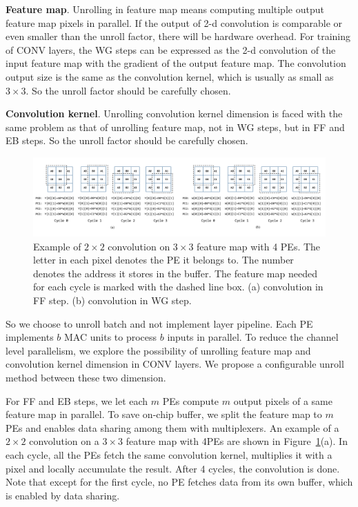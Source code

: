 {\bf{Feature map}}. Unrolling in feature map means computing multiple output feature map pixels in parallel. If the output of 2-d convolution is comparable or even smaller than the unroll factor, there will be hardware overhead. For training of CONV layers, the WG steps can be expressed as the 2-d convolution of the input feature map with the gradient of the output feature map. The convolution output size is the same as the convolution kernel, which is usually as small as $3\times 3$. So the unroll factor should be carefully chosen.

{\bf{Convolution kernel}}. Unrolling convolution kernel dimension is faced with the same problem as that of unrolling feature map, not in WG steps, but in FF and EB steps. So the unroll factor should be carefully chosen.

\begin{figure}[t]
  \centering
  \includegraphics[width=2.0\columnwidth]{figures/mmap.pdf}
  \caption{Example of $2\times 2$ convolution on $3\times 3$ feature map with 4 PEs. The letter in each pixel denotes the PE it belongs to. The number denotes the address it stores in the buffer. The feature map needed for each cycle is marked with the dashed line box. (a) convolution in FF step. (b) convolution in WG step.}
  \label{fig:mmap}
\end{figure}

So we choose to unroll batch and not implement layer pipeline. Each PE implements $b$ MAC units to process $b$ inputs in parallel. To reduce the channel level parallelism, we explore the possibility of unrolling feature map and convolution kernel dimension in CONV layers. We propose a configurable unroll method between these two dimension. 

For FF and EB steps, we let each $m$ PEs compute $m$ output pixels of a same feature map in parallel. To save on-chip buffer, we split the feature map to $m$ PEs and enables data sharing among them with multiplexers. An example of a $2\times 2$ convolution on a $3\times 3$ feature map with 4PEs are shown in Figure~\ref{fig:mmap}(a). In each cycle, all the PEs fetch the same convolution kernel, multiplies it with a pixel and locally accumulate the result. After 4 cycles, the convolution is done. Note that except for the first cycle, no PE fetches data from its own buffer, which is enabled by data sharing.

